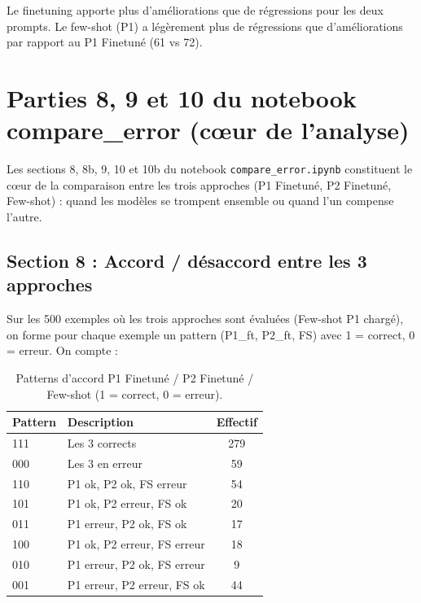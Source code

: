 \documentclass[11pt,a4paper]{article}
\begin{document}
Le finetuning apporte plus d’améliorations que de régressions pour les deux prompts. Le few-shot (P1) a légèrement plus de régressions que d’améliorations par rapport au P1 Finetuné (61 vs 72).

\section{Parties 8, 9 et 10 du notebook compare\_error (cœur de l'analyse)}

Les sections 8, 8b, 9, 10 et 10b du notebook \texttt{compare\_error.ipynb} constituent le cœur de la comparaison entre les trois approches (P1 Finetuné, P2 Finetuné, Few-shot) : quand les modèles se trompent ensemble ou quand l'un compense l'autre.

\subsection{Section 8 : Accord / désaccord entre les 3 approches}

Sur les 500 exemples où les trois approches sont évaluées (Few-shot P1 chargé), on forme pour chaque exemple un pattern (P1\_ft, P2\_ft, FS) avec 1 = correct, 0 = erreur. On compte :

\begin{table}[H]
  \centering
  \caption{Patterns d’accord P1 Finetuné / P2 Finetuné / Few-shot (1 = correct, 0 = erreur).}
  \label{tab:patterns}
  \begin{tabular}{llc}
    \toprule
    Pattern & Description & Effectif \\
    \midrule
    111 & Les 3 corrects & 279 \\
    000 & Les 3 en erreur & 59 \\
    110 & P1 ok, P2 ok, FS erreur & 54 \\
    101 & P1 ok, P2 erreur, FS ok & 20 \\
    011 & P1 erreur, P2 ok, FS ok & 17 \\
    100 & P1 ok, P2 erreur, FS erreur & 18 \\
    010 & P1 erreur, P2 ok, FS erreur & 9 \\
    001 & P1 erreur, P2 erreur, FS ok & 44 \\
    \bottomrule
  \end{tabular}
\end{table}
\end{document}
